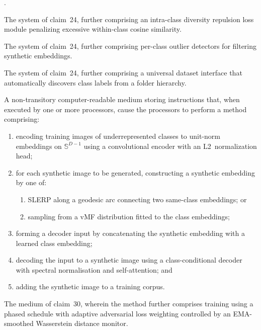 \documentclass[12pt,letterpaper]{article}
\newcommand{\Sphere}{\mathbb{S}}
\newcounter{claimnum}
\newenvironment{claims}{%
  \setcounter{claimnum}{0}
  \begin{list}{\arabic{claimnum}.}{%
    \usecounter{claimnum}
    \setlength{\leftmargin}{2em}
    \setlength{\labelsep}{0.5em}
    \setlength{\itemsep}{0pt}
    \setlength{\parsep}{6pt plus 2pt}
  }%
}{\end{list}}
\begin{document}
\begin{claims}
\item The system of claim~24, further comprising an intra-class diversity
repulsion loss module penalizing excessive within-class cosine similarity.

\item The system of claim~24, further comprising per-class outlier
detectors for filtering synthetic embeddings.

\item The system of claim~24, further comprising a universal dataset
interface that automatically discovers class labels from a folder hierarchy.


\item A non-transitory computer-readable medium storing instructions that,
when executed by one or more processors, cause the processors to perform a
method comprising:
\begin{enumerate}[label=(\alph*),leftmargin=1.5em,nosep]
  \item encoding training images of underrepresented classes to unit-norm
    embeddings on $\Sphere^{D-1}$ using a convolutional encoder with an
    L2~normalization head;
  \item for each synthetic image to be generated, constructing a synthetic
    embedding by one of:
    \begin{enumerate}[label=(\roman*),nosep]
      \item SLERP along a geodesic arc connecting two same-class embeddings; or
      \item sampling from a vMF distribution fitted to the class embeddings;
    \end{enumerate}
  \item forming a decoder input by concatenating the synthetic embedding with
    a learned class embedding;
  \item decoding the input to a synthetic image using a class-conditional
    decoder with spectral normalisation and self-attention; and
  \item adding the synthetic image to a training corpus.
\end{enumerate}

\item The medium of claim~30, wherein the method further comprises training
using a phased schedule with adaptive adversarial loss weighting controlled
by an EMA-smoothed Wasserstein distance monitor.


\end{claims}
\end{document}
